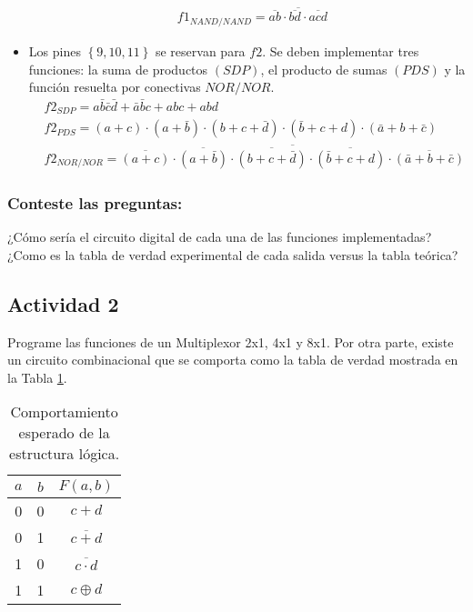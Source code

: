 \begin{itemize}
\begin{align*}
        &f1_{NAND/NAND} = \overline{\overline{ab} \cdot \overline{bd} \cdot \overline{acd}}
    \end{align*}
    \item Los pines $\left\lbrace 9,10,11\right\rbrace $ se reservan para $f2$. Se deben implementar tres funciones: la suma de productos $(SDP)$, el producto de sumas $(PDS)$ y la función resuelta por conectivas $NOR/NOR$.
    \begin{align*}
        &f2_{SDP} = a\bar{b}\bar{c}\bar{d} + \bar{a}\bar{b}c + abc + abd\\
        &f2_{PDS} = (a+c)\cdot (a+\bar{b})\cdot(b+c+\bar{d})\cdot(\bar{b}+c+d)\cdot (\bar{a}+b+\bar{c})\\
        &f2_{NOR/NOR} = \overline{\overline{(a+c)}\cdot \overline{(a+\bar{b})}\cdot \overline{(b+c+\bar{d})} \cdot \overline{(\bar{b}+c+d)} \cdot \overline{(\bar{a}+b+\bar{c})}}
    \end{align*}
\end{itemize}
 
\subsubsection{Conteste las preguntas:}

¿Cómo sería el circuito digital de cada una de las funciones implementadas?
¿Como es la tabla de verdad experimental de cada salida versus la tabla teórica?


\subsection{Actividad 2}

Programe las funciones de un Multiplexor 2x1, 4x1 y 8x1.
Por otra parte, existe un circuito  combinacional que se comporta como la tabla de verdad mostrada en la Tabla \ref{tab:tv}.

\begin{table}[H]
\centering
\caption{Comportamiento esperado de la estructura lógica.}
\label{tab:tv}
\begin{tabular}{ccc}
    \toprule 
    $a$ & $b$ & $F(a,b)$ \\ 
    \midrule
    0 & 0 & $c + d$ \\ 
    0 & 1 & $\overline{c + d}$ \\ 
    1 & 0 & $\overline{c \cdot d}$ \\ 
    1 & 1 & $c \oplus d$ \\ 
    \bottomrule
\end{tabular} 

\end{table}

